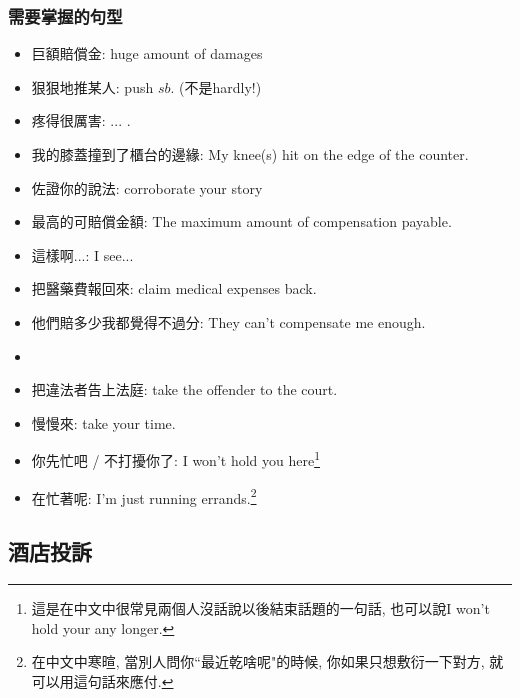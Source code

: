 \subsubsection*{需要掌握的句型}
\begin{multicols}{2}
\begin{itemize}
  \itemsep0em
  \item 巨額賠償金: huge amount of damages
  \item 狠狠地推某人: push $sb.$  (不是hardly!)
  \item 疼得很厲害: ... .
  \item 我的膝蓋撞到了櫃台的邊緣: My knee(s)  hit on the edge of the counter.
  \item 佐證你的說法: corroborate your story
  \item 最高的可賠償金額: The maximum amount of compensation payable.
  \item 這樣啊...: I see...
  \item 把醫藥費報回來: claim medical expenses back.
  \item 他們賠多少我都覺得不過分: They can't compensate me enough.
  \item {}
  \item 把違法者告上法庭: take the offender to the court.
  \item 慢慢來: take your time.
  \item 你先忙吧 / 不打擾你了: I won't hold you here\footnote{這是在中文中很常見兩個人沒話說以後結束話題的一句話, 也可以說I won't hold your any longer.}
  \item 在忙著呢: I'm just running errands.\footnote{在中文中寒暄, 當別人問你``最近乾啥呢"的時候, 你如果只想敷衍一下對方, 就可以用這句話來應付.}
\end{itemize}
\end{multicols}

\subsection{酒店投訴}
